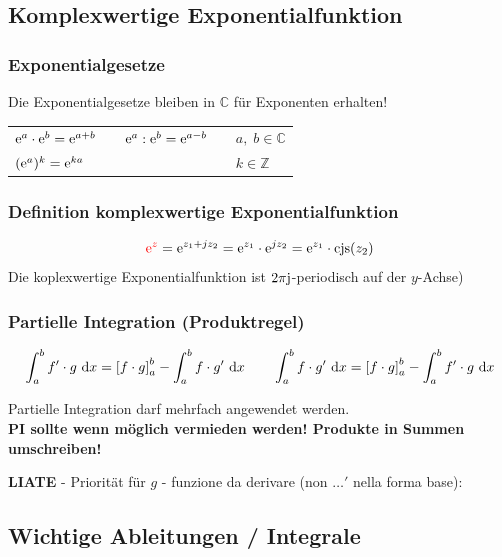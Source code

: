 \subsection{Komplexwertige Exponentialfunktion}

\subsubsection{Exponentialgesetze}

Die Exponentialgesetze bleiben in $\mathbb{C}$ für  Exponenten erhalten!

\begin{tabular}{lll ll}
    $\mathrm{e}^a \cdot \mathrm{e}^b = \mathrm{e}^{a+b}$    & & $\mathrm{e}^a : \mathrm{e}^b = \mathrm{e}^{a-b}$    & & $a, \; b \in \mathbb{C}$    \\
    $(\mathrm{e}^a)^k = \mathrm{e}^{ka}$            & &                             & & $k \in \mathbb{Z}$
\end{tabular}


\subsubsection{Definition komplexwertige Exponentialfunktion}

\vspace{-0.2cm}
$${\color{red}\mathrm{e}^z} = \mathrm{e}^{z_1 + jz_2} = \mathrm{e}^{z_1} \cdot \mathrm{e}^{j z_2} = \mathrm{e}^{z_1} \cdot \mathrm{cjs}(z_2)$$
Die koplexwertige Exponentialfunktion ist $2 \pi \mathrm{j}$-periodisch auf der $y$-Achse) 
    

\subsubsection{Partielle Integration (Produktregel)}
\vspace{-1em}

\[\int_{a}^{b} f'\cdot g \, \mathop{} \! \mathrm{d} x = \left[ f\cdot g \right]_{a}^{b} - \int_{a}^{b} f\cdot g' \, \mathop{} \! \mathrm{d} x
\qquad
\int_{a}^{b} f\cdot g' \, \mathop{} \! \mathrm{d} x = \left[ f\cdot g \right]_{a}^{b} - \int_{a}^{b} f' \cdot g \, \mathop{} \! \mathrm{d} x
\]

Partielle Integration darf mehrfach angewendet werden. \\
\textbf{PI sollte wenn möglich vermieden werden! Produkte in Summen umschreiben!}\vspace{1em}

\textbf{LIATE} - Priorität für $g$ - funzione da derivare (non $\dots'$ nella forma base):

\subsection{Wichtige Ableitungen / Integrale}

